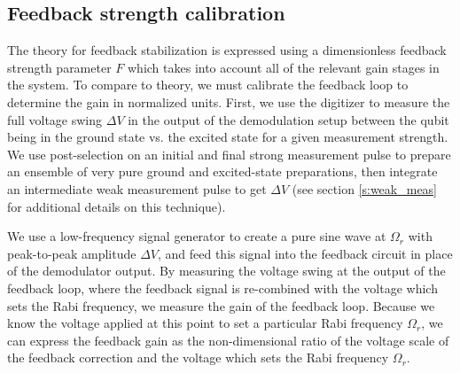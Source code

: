 \subsection{Feedback strength calibration}

The theory for feedback stabilization is expressed using a dimensionless feedback strength parameter $F$ which takes into account all of the relevant gain stages in the system.  To compare to theory, we must calibrate the feedback loop to determine the gain in normalized units.  First, we use the digitizer to measure the full voltage swing $\Delta V$ in the output of the demodulation setup between the qubit being in the ground state vs. the excited state for a given measurement strength.  We use post-selection on an initial and final strong measurement pulse to prepare an ensemble of very pure ground and excited-state preparations, then integrate an intermediate weak measurement pulse to get $\Delta V$ (see section \ref{s:weak_meas} for additional details on this technique).

We use a low-frequency signal generator to create a pure sine wave at $\Omega_r$ with peak-to-peak amplitude $\Delta V$, and feed this signal into the feedback circuit in place of the demodulator output.  By measuring the voltage swing at the output of the feedback loop, where the feedback signal is re-combined with the voltage which sets the Rabi frequency, we measure the gain of the feedback loop.  Because we know the voltage applied at this point to set a particular Rabi frequency $\Omega_r$, we can express the feedback gain as the non-dimensional ratio of the voltage scale of the feedback correction and the voltage which sets the Rabi frequency $\Omega_r$.










